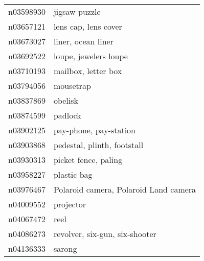\begin{appendices}
\begin{longtabu}{X|X[4]}
    		n03598930 &                                                                                                              jigsaw puzzle \tabularnewline
    		n03657121 &                                                                                                       lens cap, lens cover \tabularnewline
    		n03673027 &                                                                                                         liner, ocean liner \tabularnewline
    		n03692522 &                                                                                                      loupe, jewelers loupe \tabularnewline
    		n03710193 &                                                                                                        mailbox, letter box \tabularnewline
    		n03794056 &                                                                                                                  mousetrap \tabularnewline
    		n03837869 &                                                                                                                    obelisk \tabularnewline
    		n03874599 &                                                                                                                    padlock \tabularnewline
    		n03902125 &                                                                                                     pay-phone, pay-station \tabularnewline
    		n03903868 &                                                                                                pedestal, plinth, footstall \tabularnewline
    		n03930313 &                                                                                                       picket fence, paling \tabularnewline
    		n03958227 &                                                                                                                plastic bag \tabularnewline
    		n03976467 &                                                                                      Polaroid camera, Polaroid Land camera \tabularnewline
    		n04009552 &                                                                                                                  projector \tabularnewline
    		n04067472 &                                                                                                                       reel \tabularnewline
    		n04086273 &                                                                                             revolver, six-gun, six-shooter \tabularnewline
    		n04136333 &                                                                                                                     sarong \tabularnewline

\end{longtabu}
\end{appendices}
